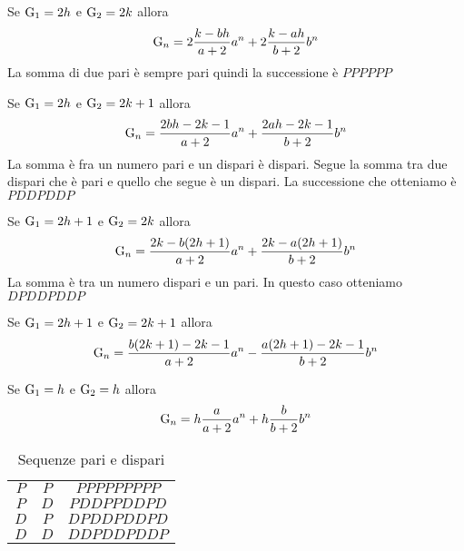 \begin{commento}
	Se $\mathrm{G}_{1}={}2h$ e $\mathrm{G}_{2}={}2k$ allora \begin{equation}
		\mathrm{G}_{n}={}2\dfrac{k-bh}{a+2}a^n+2\dfrac{k-ah}{b+2}b^n
	\end{equation}
La somma di due pari è sempre pari quindi la successione è $PPPPPP$
\end{commento}
\begin{commento}
	Se $\mathrm{G}_{1}={}2h$ e $\mathrm{G}_{2}={}2k+1$ allora \begin{equation}
		\mathrm{G}_{n}={}\dfrac{2bh-2k-1}{a+2}a^n+\dfrac{2ah-2k-1}{b+2}b^n
	\end{equation}
La somma è fra un numero pari e un dispari è dispari. Segue la somma tra due dispari che è pari e quello che segue è un dispari. La successione che otteniamo  è $PDDPDDP$
\end{commento}
\begin{commento}
	Se $\mathrm{G}_{1}={}2h+1$ e $\mathrm{G}_{2}={}2k$ allora \begin{equation}
		\mathrm{G}_{n}={}\dfrac{2k-b(2h+1)}{a+2}a^n+\dfrac{2k-a(2h+1)}{b+2}b^n
	\end{equation}
La somma è tra un numero dispari e un pari. In questo caso otteniamo $DPDDPDDP$
\end{commento}
\begin{commento}
	Se $\mathrm{G}_{1}={}2h+1$ e $\mathrm{G}_{2}={}2k+1$ allora \begin{equation}
		\mathrm{G}_{n}={}\dfrac{b(2k+1)-2k-1}{a+2}a^n-\dfrac{a(2h+1)-2k-1}{b+2}b^n
	\end{equation}
\end{commento}
\begin{commento}
	Se $\mathrm{G}_{1}={}h$ e $\mathrm{G}_{2}={}h$ allora \begin{equation}
		\mathrm{G}_{n}={}h\dfrac{a}{a+2}a^n+h\dfrac{b}{b+2}b^n
	\end{equation}
\end{commento}
\begin{table}
	\centering
	\begin{tabular}{ccc}
\toprule
	$P$& $P$ &$PPPPPPPPP$ \\
	$P$& $D$ &$PDDPPDDPD$  \\
	$D$& $P$ &$DPDDPDDPD$  \\
	$D$& $D$ &$DDPDDPDDP$  \\
\bottomrule
\end{tabular}
	\caption{Sequenze pari e dispari}
\end{table}
